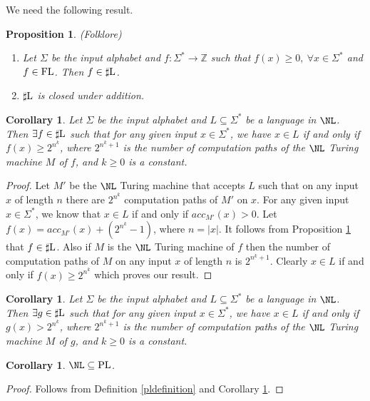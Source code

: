 \documentclass{amsbook}
\newtheorem{corollary}[theorem]{Corollary}
\newtheorem{proposition}[theorem]{Proposition}
\theoremstyle{definition}
\theoremstyle{remark}
\numberwithin{section}{chapter}
\numberwithin{equation}{chapter}
\newcommand{\sharpL}{\mbox{$\sharp$\rm L}}
\renewcommand{\PL}{\mbox{\rm PL}}
\newcommand{\FL}{\mbox{\rm FL}}
\newcommand{\Z}{\mathbb{Z}}
\begin{document}
We need the following result.
\begin{proposition}\emph{(Folklore)}\label{sharplfolklore}
\begin{enumerate}
\item Let $\Sigma$ be the input alphabet and $f:\Sigma^{*}\rightarrow\Z$ such that $f(x)\geq 0,~\forall x\in\Sigma^*$ and $f\in \FL$. Then $f\in\sharpL$.
\item $\sharpL$ is closed under addition.
\end{enumerate}
\end{proposition}
\begin{corollary}\label{nlproperty}
Let $\Sigma$ be the input alphabet and $L\subseteq\Sigma^*$ be a language in $\NL$. Then $\exists f\in\sharpL$ such that for any given input $x\in\Sigma^*$, we have $x\in L$ if and only if $f(x)\geq 2^{n^k}$, where $2^{n^k+1}$ is the number of computation paths of the $\NL$ Turing machine $M$ of $f$, and $k\geq 0$ is a constant.
\end{corollary}
\begin{proof}
Let $M'$ be the $\NL$ Turing machine that accepts $L$ such that on any input $x$ of length $n$ there are $2^{n^k}$ computation paths of $M'$ on $x$. For any given input $x\in\Sigma^*$, we know that $x\in L$ if and only if $acc_{M'}(x)>0$. Let $f(x)=acc_{M'}(x)+(2^{n^k}-1)$, where $n=|x|$. It follows from Proposition \ref{sharplfolklore} that $f\in\sharpL$. Also if $M$ is the $\NL$ Turing machine of $f$ then the number of computation paths of $M$ on any input $x$ of length $n$ is $2^{n^k+1}$. Clearly $x\in L$ if and only if $f(x)\geq 2^{n^k}$ which proves our result.
\end{proof}
\begin{corollary}\label{nlpropertyplusone}
Let $\Sigma$ be the input alphabet and $L\subseteq\Sigma^*$ be a language in $\NL$. Then $\exists g\in\sharpL$ such that for any given input $x\in\Sigma^*$, we have $x\in L$ if and only if $g(x)> 2^{n^k}$, where $2^{n^k+1}$ is the number of computation paths of the $\NL$ Turing machine $M$ of $g$, and $k\geq 0$ is a constant.
\end{corollary}
\begin{corollary}\label{nlpl}
$\NL\subseteq\PL$.
\end{corollary}
\begin{proof}
Follows from Definition \ref{pldefinition} and Corollary \ref{nlpropertyplusone}.
\end{proof}
\end{document}
